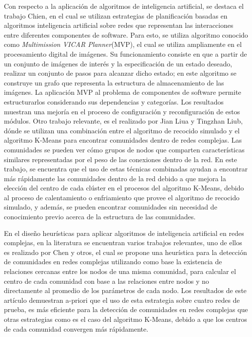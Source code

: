 Con respecto a la aplicación de algoritmos de inteligencia artificial, se destaca el trabajo Chien\cite{Chien1998}, en el cual se utilizan estrategias de planificación basadas en algoritmos inteligencia
artificial sobre redes que representan las interacciones entre diferentes componentes de software. Para esto, se utiliza algoritmo conocido como \textit{Multimission VICAR Planner}(MVP), el cual se utiliza ampliamente en el procesamiento digital de imágenes. Su funcionamiento consiste en que a partir de un conjunto
de imágenes de interés y la especificación de un estado deseado, realizar un conjunto de pasos para alcanzar dicho estado; en este algoritmo se construye un grafo que representa la estructura de almacenamiento de las imágenes. La aplicación MVP al problema de componentes de software permite estructurarlos considerando sus dependencias
y categorías. Los resultados muestran una mejoría en el proceso de configuración y reconfiguración de estos módulos. Otro trabajo relevante, es el realizado por Jian Liua y Tingzhan Liub\cite{Liu2010}, dónde se utilizan una combinación entre el algoritmo de recocido simulado y el algoritmo K-Means para encontrar comunidades dentro de redes complejas. Las comunidades se pueden ver cómo grupos de nodos que comparten características similares representadas por el peso de las conexiones dentro de la
red. En este trabajo, se encuentra que el uso de estas técnicas combinadas ayudan a encontrar más rápidamente las comunidades dentro de la red debido a que mejora la elección del centro de cada clúster en el procesos del algoritmo K-Means, debido al proceso de calentamiento o enfriamiento que provee el algoritmo de recocido simulado, y además, se pueden encontrar comunidades sin necesidad de conocimiento previo acerca de la estructura de las comunidades.

En el diseño heurísticas para aplicar algoritmos de inteligencia artificial en redes complejas, en la literatura se encuentran varios trabajos relevantes, uno de ellos es realizado por Chen y otros\cite{Chen2009}, el cual se propone una heurística para la detección de comunidades en redes complejas utilizando como base la existencia de relaciones cercanas entre los nodos de una misma comunidad, para calcular el centro de cada comunidad con base a las relaciones entre nodos y no directamente al promedio de los parámetros de cada nodo. Los resultados de este artículo demuestran a-priori que el uso de esta estrategia sobre cuatro redes de prueba, es más eficiente para la detección de comunidades en redes complejas que otras estrategias como es el caso del algoritmo K-Means, debido a que los centros de cada comunidad convergen más rápidamente.